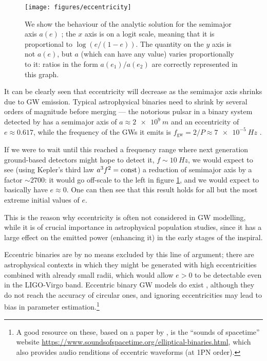 \documentclass[main.tex]{subfiles}
\begin{document}
\begin{figure}[ht]
\centering
\texttt{[image: figures/eccentricity]}
\caption{We show the behaviour of the analytic solution for the semimajor axis \(a(e)\) \cite[eq.\ 4.126]{maggioreGravitationalWavesVolume2007}; the \(x\) axis is on a logit scale, meaning that it is proportional to \(\log (e / (1-e))\). The quantity on the \(y\) axis is not \(a(e)\), but \(a\) (which can have any value) varies proportionally to it: ratios in the form \(a(e_1) / a(e_2)\) are correctly represented in this graph.}
\label{fig:eccentricity}
\end{figure}

It can be clearly seen that eccentricity will decrease as the semimajor axis shrinks due to \ac{GW} emission.
Typical astrophysical binaries need to shrink by several orders of magnitude before merging --- the notorious pulsar in a binary system detected by \textcite{hulseDiscoveryPulsarBinary1975} has a semimajor axis of \(a \approx \SI{2e9}{m}\) and an eccentricity of \(e \approx 0.617\), while the frequency of the \acsp{GW} it emits is \(f _{\text{gw}} = 2 / P \approx \SI{7e-5}{Hz}\) \cite{taylorNewTestGeneral1982}. 

If we were to wait until this reached a frequency range where next generation ground-based detectors might hope to detect it, \(f \sim \SI{10}{Hz}\), we would expect to see (using Kepler's third law \(a^3 f^2 = \mathrm{const}\)) a reduction of semimajor axis by a factor \(\sim 2700\): it would go off-scale to the left in figure \ref{fig:eccentricity}, and we would expect to basically have \(e \approx 0\). 
One can then see that this result holds for all but the most extreme initial values of \(e\). 

This is the reason why eccentricity is often not considered in \ac{GW} modelling, while it is of crucial importance in astrophysical population studies, since it has a large effect on the emitted power (enhancing it) in the early stages of the inspiral.

Eccentric binaries are by no means excluded by this line of argument; there are astrophysical contexts in which they might be generated with high eccentricities combined with already small radii, which would allow \(e > 0\) to be detectable even in the \ac{LIGO}-Virgo band.
Eccentric binary \ac{GW} models do exist \cite{favataConstrainingOrbitalEccentricity2021}, although they do not reach the accuracy of circular ones, and ignoring eccentricities may lead to bias in parameter estimation.\footnote{A good resource on these, based on a paper by \textcite{favataGravitationalwaveMemoryEccentric2011}, is the ``sounds of spacetime'' website \href{Sounds of Spacetime}{https://www.soundsofspacetime.org/elliptical-binaries.html}, which also provides audio renditions of eccentric waveforms (at 1\ac{PN} order).}
\end{document}

